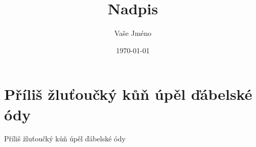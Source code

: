 \documentclass[a4paper]{article}
\title{Nadpis}
\author{Vaše Jméno}
\date{\today}
\begin{document}
\maketitle
\tableofcontents

\section{Příliš žluťoučký kůň úpěl ďábelské ódy}
Příliš žluťoučký kůň úpěl ďábelské ódy 
\end{document}
